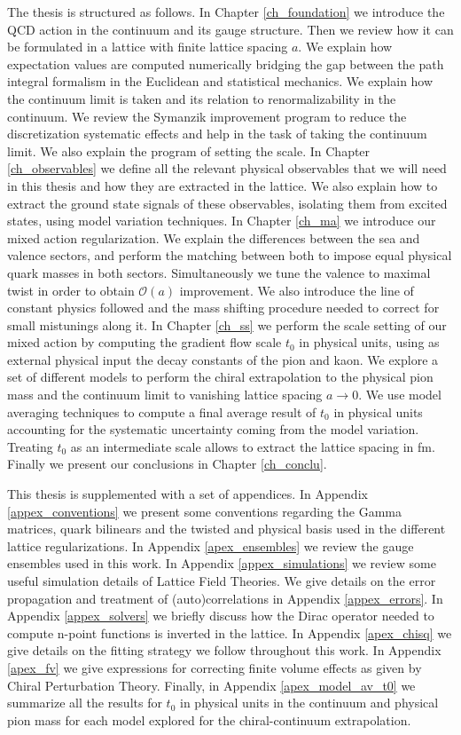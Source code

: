 The thesis is structured as follows. In Chapter \ref{ch_foundation} we introduce the QCD action in the continuum and its gauge structure. Then we review how it can be formulated in a lattice with finite lattice spacing $a$. We explain how expectation values are computed numerically bridging the gap between the path integral formalism in the Euclidean and statistical mechanics. We explain how the continuum limit is taken and its relation to renormalizability in the continuum. We review the Symanzik improvement program to reduce the discretization systematic effects and help in the task of taking the continuum limit. We also explain the program of setting the scale. In Chapter \ref{ch_observables} we define all the relevant physical observables that we will need in this thesis and how they are extracted in the lattice. We also explain how to extract the ground state signals of these observables, isolating them from excited states, using model variation techniques. In Chapter \ref{ch_ma} we introduce our mixed action regularization. We explain the differences between the sea and valence sectors, and perform the matching between both to impose equal physical quark masses in both sectors. Simultaneously we tune the valence to maximal twist in order to obtain $\mathcal{O}(a)$ improvement. We also introduce the line of constant physics followed and the mass shifting procedure needed to correct for small mistunings along it. In Chapter \ref{ch_ss} we perform the scale setting of our mixed action by computing the gradient flow scale $t_0$ in physical units, using as external physical input the decay constants of the pion and kaon. We explore a set of different models to perform the chiral extrapolation to the physical pion mass and the continuum limit to vanishing lattice spacing $a\to0$. We use model averaging techniques to compute a final average result of $t_0$ in physical units accounting for the systematic uncertainty coming from the model variation. Treating $t_0$ as an intermediate scale allows to extract the lattice spacing in fm. Finally we present our conclusions in Chapter \ref{ch_conclu}. 

This thesis is supplemented with a set of appendices. In Appendix \ref{appex_conventions} we present some conventions regarding the Gamma matrices, quark bilinears and the twisted and physical basis used in the different lattice regularizations. In Appendix \ref{apex_ensembles} we review the gauge ensembles used in this work. In Appendix \ref{appex_simulations} we review some useful simulation details of Lattice Field Theories. We give details on the error propagation and treatment of (auto)correlations in Appendix \ref{appex_errors}. In Appendix \ref{appex_solvers} we briefly discuss how the Dirac operator needed to compute n-point functions is inverted in the lattice. In Appendix \ref{apex_chisq} we give details on the fitting strategy we follow throughout this work. In Appendix \ref{apex_fv} we give expressions for correcting finite volume effects as given by Chiral Perturbation Theory. Finally, in Appendix \ref{apex_model_av_t0} we summarize all the results for $t_0$ in physical units in the continuum and physical pion mass for each model explored for the chiral-continuum extrapolation.

